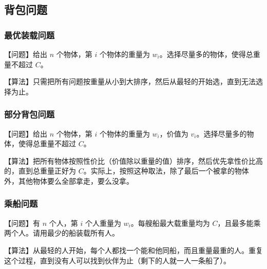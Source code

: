 \subsection{背包问题}

\subsubsection{最优装载问题}
	【问题】给出 $n$ 个物体，第 $i$ 个物体的重量为 $w_i$。选择尽量多的物体，使得总重量不超过 $C$。

	【算法】只需把所有问题按重量从小到大排序，然后从最轻的开始选，直到无法选择为止。

\subsubsection{部分背包问题}
	【问题】给出 $n$ 个物体，第 $i$ 个物体的重量为 $w_i$，价值为 $v_i$。选择尽量多的物体，使得总重量不超过 $C$。

	【算法】把所有物体按照性价比（价值除以重量的值）排序，然后优先拿性价比高的，直到总重量正好为 $C$。实际上，按照这种取法，除了最后一个被拿的物体外，其他物体要么全部拿走，要么没拿。

\subsubsection{乘船问题}
	【问题】有 $n$ 个人，第 $i$ 个人重量为 $w_i$。每艘船最大载重量均为 $C$，且最多能乘两个人。请用最少的船装载所有人。

	【算法】从最轻的人开始，每个人都找一个能和他同船，而且重量最重的人。重复这个过程，直到没有人可以找到伙伴为止（剩下的人就一人一条船了）。
